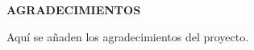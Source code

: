 \begin{center}
{\Large \bfseries AGRADECIMIENTOS}
\vspace{2.5cm}
\end{center}
Aquí se añaden los agradecimientos del proyecto.